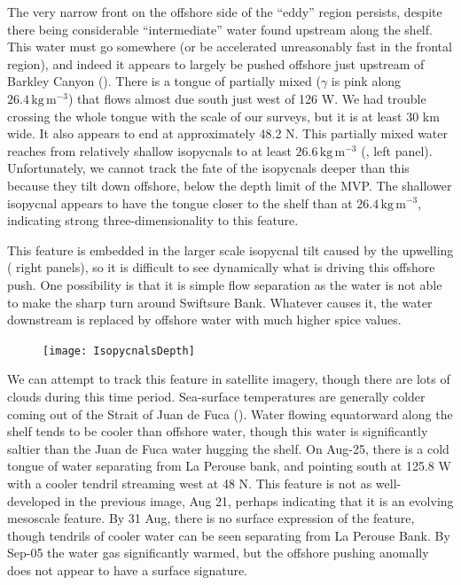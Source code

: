 \documentclass[draft]{agujournal2019}
\begin{document}
The very narrow front on the offshore side of the ``eddy'' region persists, despite there being considerable ``intermediate'' water found upstream along the shelf.  This water must go somewhere (or be accelerated unreasonably fast in the frontal region), and indeed it appears to largely be pushed offshore just upstream of Barkley Canyon ().  There is a tongue of partially mixed ($\gamma$ is pink along $26.4\,\mathrm{kg\,m^{-3}}$) that flows almost due south just west of 126 W. We had trouble crossing the whole tongue with the scale of our surveys, but it is at least 30 km wide. It also appears to end at approximately 48.2 N.  This partially mixed water reaches from relatively shallow isopycnals to at least $26.6\,\mathrm{kg\,m^{-3}}$ (, left panel).  Unfortunately, we cannot track the fate of the isopycnals deeper than this because they tilt down offshore, below the depth limit of the MVP.   The shallower isopycnal appears to have the tongue closer to the shelf than at $26.4\,\mathrm{kg\,m^{-3}}$, indicating strong three-dimensionality to this feature.

This feature is embedded in the larger scale isopycnal tilt caused by the upwelling ( right panels), so it is difficult to see dynamically what is driving this offshore push.  One possibility is that it is simple flow separation as the water is not able to make the sharp turn around Swiftsure Bank.  Whatever causes it, the water downstream is replaced by offshore water with much higher spice values.


\begin{figure}[htbp]
  \begin{center}
    \texttt{[image: IsopycnalsDepth]}
    \caption{
      \label{fig:IsopycnalsDepth} }
  \end{center}
\end{figure}

We can attempt to track this feature in satellite imagery, though there are lots of clouds during this time period.  Sea-surface temperatures are generally colder coming out of the Strait of Juan de Fuca ().  Water flowing equatorward along the shelf tends to be cooler than offshore water, though this water is significantly saltier than the Juan de Fuca water hugging the shelf. On Aug-25, there is a cold tongue of water separating from La Perouse bank, and pointing south at 125.8 W with a cooler tendril streaming west at 48 N.  This feature is not as well-developed in the previous image, Aug 21, perhaps indicating that it is an evolving mesoscale feature.  By 31 Aug, there is no surface expression of the feature, though tendrils of cooler water can be seen separating from La Perouse Bank.  By Sep-05 the water gas significantly warmed, but the offshore pushing anomally does not appear to have a surface signature.
\end{document}

